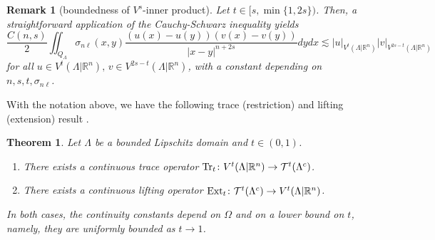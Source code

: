 \documentclass{amsart}
\newcommand{\domain}{\Lambda}
\newcommand{\snl}{{\sigma_{n\ell}}}
\def\calT{\mathcal{T}}
\def\R{{\mathbb R}}
\newtheorem{theorem}{Theorem}
\theoremstyle{plain}
\newtheorem{remark}{Remark}
\numberwithin{equation}{section}
\numberwithin{table}{section}
\numberwithin{figure}{section}
\numberwithin{theorem}{section}
\numberwithin{corollary}{section}
\numberwithin{definition}{section}
\numberwithin{lemma}{section}
\numberwithin{proposition}{section}
\numberwithin{remark}{section}
\begin{document}
\begin{remark}[boundedness of $V^s$-inner product]\label{rem:Cauchy-Schwarz}
Let $t \in [s, \min\{1,2s\})$. Then, a straightforward application of the Cauchy-Schwarz inequality yields
\[
\frac{C(n,s)}{2} \iint_{Q_\domain}  \snl(x,y) \frac{(u(x)-u(y))(v(x)-v(y))}{|x-y|^{n+2s}} dy dx \lesssim |u|_{V^t(\domain | \R^n)} |v|_{V^{2s-t}(\domain | \R^n)}
\]
for all $u \in V^{t}(\domain | \R^n), \, v \in V^{2s-t}(\domain | \R^n)$, with a constant depending on $n,s,t, \snl$.
\end{remark}

With the notation above, we have the following trace (restriction) and lifting (extension) result \cite[Theorem 1.2]{GrKa23}.

\begin{theorem} \label{thm:trace-extension}
Let $\domain$ be a bounded Lipschitz domain and $t \in (0,1)$.
\begin{enumerate}
\item There exists a continuous trace operator ${\rm Tr}_t \colon V^t(\domain | \R^n) \to \calT^t(\domain^c)$.

\item There exists a continuous lifting operator ${\rm Ext}_t \colon \calT^t(\domain^c) \to V^t(\domain | \R^n)$.
\end{enumerate}
In both cases, the continuity constants depend on $\Omega$ and on a lower bound on $t$, namely, they are uniformly bounded as $t \to 1$.
\end{theorem}
\end{document}
